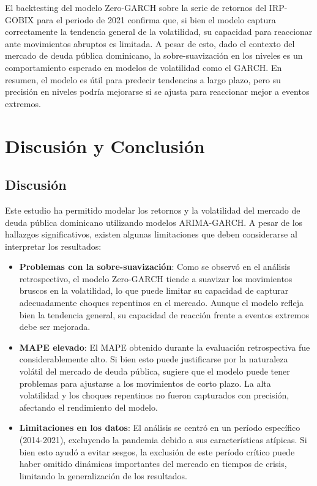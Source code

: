 \documentclass[
  number,
  preprint,
  3p,
  onecolumn]{elsarticle}
\begin{document}
El backtesting del modelo Zero-GARCH sobre la serie de retornos del
IRP-GOBIX para el periodo de 2021 confirma que, si bien el modelo
captura correctamente la tendencia general de la volatilidad, su
capacidad para reaccionar ante movimientos abruptos es limitada. A pesar
de esto, dado el contexto del mercado de deuda pública dominicano, la
sobre-suavización en los niveles es un comportamiento esperado en
modelos de volatilidad como el GARCH. En resumen, el modelo es útil para
predecir tendencias a largo plazo, pero su precisión en niveles podría
mejorarse si se ajusta para reaccionar mejor a eventos extremos.

\section{Discusión y Conclusión}\label{discusiuxf3n-y-conclusiuxf3n}

\subsection{Discusión}\label{discusiuxf3n}

Este estudio ha permitido modelar los retornos y la volatilidad del
mercado de deuda pública dominicano utilizando modelos ARIMA-GARCH. A
pesar de los hallazgos significativos, existen algunas limitaciones que
deben considerarse al interpretar los resultados:

\begin{itemize}
\item
  \textbf{Problemas con la sobre-suavización}: Como se observó en el
  análisis retrospectivo, el modelo Zero-GARCH tiende a suavizar los
  movimientos bruscos en la volatilidad, lo que puede limitar su
  capacidad de capturar adecuadamente choques repentinos en el mercado.
  Aunque el modelo refleja bien la tendencia general, su capacidad de
  reacción frente a eventos extremos debe ser mejorada.
\item
  \textbf{MAPE elevado}: El MAPE obtenido durante la evaluación
  retrospectiva fue considerablemente alto. Si bien esto puede
  justificarse por la naturaleza volátil del mercado de deuda pública,
  sugiere que el modelo puede tener problemas para ajustarse a los
  movimientos de corto plazo. La alta volatilidad y los choques
  repentinos no fueron capturados con precisión, afectando el
  rendimiento del modelo.
\item
  \textbf{Limitaciones en los datos}: El análisis se centró en un
  período específico (2014-2021), excluyendo la pandemia debido a sus
  características atípicas. Si bien esto ayudó a evitar sesgos, la
  exclusión de este período crítico puede haber omitido dinámicas
  importantes del mercado en tiempos de crisis, limitando la
  generalización de los resultados.
\end{itemize}
\end{document}
